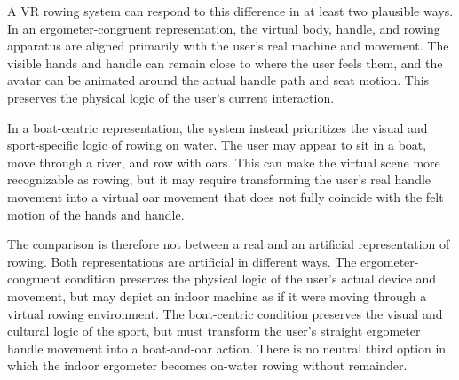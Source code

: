 %
%


A VR rowing system can respond to this difference in at least two plausible ways. In an ergometer-congruent representation, the virtual body, handle, and rowing apparatus are aligned primarily with the user's real machine and movement. The visible hands and handle can remain close to where the user feels them, and the avatar can be animated around the actual handle path and seat motion. This preserves the physical logic of the user's current interaction.

In a boat-centric representation, the system instead prioritizes the visual and sport-specific logic of rowing on water. The user may appear to sit in a boat, move through a river, and row with oars. This can make the virtual scene more recognizable as rowing, but it may require transforming the user's real handle movement into a virtual oar movement that does not fully coincide with the felt motion of the hands and handle.

The comparison is therefore not between a real and an artificial representation of rowing. Both representations are artificial in different ways. The ergometer-congruent condition preserves the physical logic of the user's actual device and movement, but may depict an indoor machine as if it were moving through a virtual rowing environment. The boat-centric condition preserves the visual and cultural logic of the sport, but must transform the user's straight ergometer handle movement into a boat-and-oar action. There is no neutral third option in which the indoor ergometer becomes on-water rowing without remainder.

